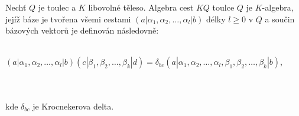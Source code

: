     \begin{dfn}
      Nechť $Q$ je toulec a $K$ libovolné těleso. Algebra cest $KQ$ toulce $Q$ je $K$-algebra, jejíž báze je 
      tvořena všemi cestami $(a|\alpha_1,\alpha_2,\ldots,\alpha_l|b)$ délky $l\geq 0 $ 
      v $Q$ a součin bázových vektorů je definován následovně: \\\\
      \centerline{
      $(a|\alpha_1,\alpha_2,\ldots,\alpha_l|b)
        (c|\beta_1,\beta_2,\ldots,\beta_k|d)        
        =\delta_{bc}(a|\alpha_1,\alpha_2,\ldots,\alpha_l,\beta_1,\beta_2,\ldots,\beta_k|b)$,
      }\\\\
      kde $\delta_{bc}$ je Krocnekerova delta.
    \end{dfn}
    


